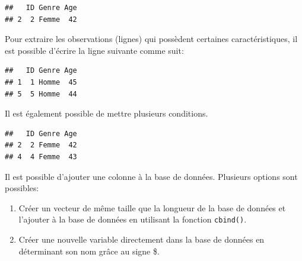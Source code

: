 \documentclass[
]{book}
\newenvironment{Shaded}{\begin{snugshade}}{\end{snugshade}}
\newcommand{\CommentTok}[1]{\textcolor[rgb]{0.56,0.35,0.01}{\textit{#1}}}
\newcommand{\DecValTok}[1]{\textcolor[rgb]{0.00,0.00,0.81}{#1}}
\newcommand{\NormalTok}[1]{#1}
\newcommand{\SpecialCharTok}[1]{\textcolor[rgb]{0.81,0.36,0.00}{\textbf{#1}}}
\newcommand{\StringTok}[1]{\textcolor[rgb]{0.31,0.60,0.02}{#1}}
\providecommand{\tightlist}{%
  \setlength{\itemsep}{0pt}\setlength{\parskip}{0pt}}
\begin{document}
\begin{verbatim}
##   ID Genre Age
## 2  2 Femme  42
\end{verbatim}

Pour extraire les observations (lignes) qui possèdent certaines caractéristiques, il est possible d'écrire la ligne suivante comme suit:

\begin{Shaded}
\end{Shaded}

\begin{verbatim}
##   ID Genre Age
## 1  1 Homme  45
## 5  5 Homme  44
\end{verbatim}

Il est également possible de mettre plusieurs conditions.

\begin{Shaded}
\end{Shaded}

\begin{verbatim}
##   ID Genre Age
## 2  2 Femme  42
## 4  4 Femme  43
\end{verbatim}

Il est possible d'ajouter une colonne à la base de données. Plusieurs options sont possibles:

\begin{enumerate}
\def\labelenumi{\arabic{enumi}.}
\tightlist
\item
  Créer un vecteur de même taille que la longueur de la base de données et l'ajouter à la base de données en utilisant la fonction \texttt{cbind()}.
\item
  Créer une nouvelle variable directement dans la base de données en déterminant son nom grâce au signe \$.
\end{enumerate}
\end{document}
